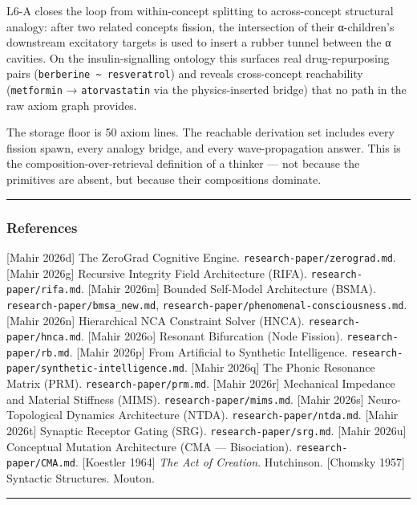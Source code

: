 \documentclass[
  11pt,
  a4paper,
]{article}
\begin{document}
L6-A closes the loop from within-concept splitting to across-concept
structural analogy: after two related concepts fission, the intersection
of their α-children's downstream excitatory targets is used to insert a
rubber tunnel between the α cavities. On the insulin-signalling ontology
this surfaces real drug-repurposing pairs
(\texttt{berberine\ \textasciitilde{}\ resveratrol}) and reveals
cross-concept reachability (\texttt{metformin} → \texttt{atorvastatin}
via the physics-inserted bridge) that no path in the raw axiom graph
provides.

The storage floor is 50 axiom lines. The reachable derivation set
includes every fission spawn, every analogy bridge, and every
wave-propagation answer. This is the composition-over-retrieval
definition of a thinker --- not because the primitives are absent, but
because their compositions dominate.

\begin{center}\rule{0.5\linewidth}{0.5pt}\end{center}

\subsubsection{References}\label{references-1}

{[}Mahir 2026d{]} The ZeroGrad Cognitive Engine.
\texttt{research-paper/zerograd.md}. {[}Mahir 2026g{]} Recursive
Integrity Field Architecture (RIFA). \texttt{research-paper/rifa.md}.
{[}Mahir 2026m{]} Bounded Self-Model Architecture (BSMA).
\texttt{research-paper/bmsa\_new.md},
\texttt{research-paper/phenomenal-consciousness.md}. {[}Mahir 2026n{]}
Hierarchical NCA Constraint Solver (HNCA).
\texttt{research-paper/hnca.md}. {[}Mahir 2026o{]} Resonant Bifurcation
(Node Fission). \texttt{research-paper/rb.md}. {[}Mahir 2026p{]} From
Artificial to Synthetic Intelligence.
\texttt{research-paper/synthetic-intelligence.md}. {[}Mahir 2026q{]} The
Phonic Resonance Matrix (PRM). \texttt{research-paper/prm.md}. {[}Mahir
2026r{]} Mechanical Impedance and Material Stiffness (MIMS).
\texttt{research-paper/mims.md}. {[}Mahir 2026s{]} Neuro-Topological
Dynamics Architecture (NTDA). \texttt{research-paper/ntda.md}. {[}Mahir
2026t{]} Synaptic Receptor Gating (SRG). \texttt{research-paper/srg.md}.
{[}Mahir 2026u{]} Conceptual Mutation Architecture (CMA ---
Bisociation). \texttt{research-paper/CMA.md}. {[}Koestler 1964{]}
\emph{The Act of Creation}. Hutchinson. {[}Chomsky 1957{]} Syntactic
Structures. Mouton.

\begin{center}\rule{0.5\linewidth}{0.5pt}\end{center}
\end{document}
